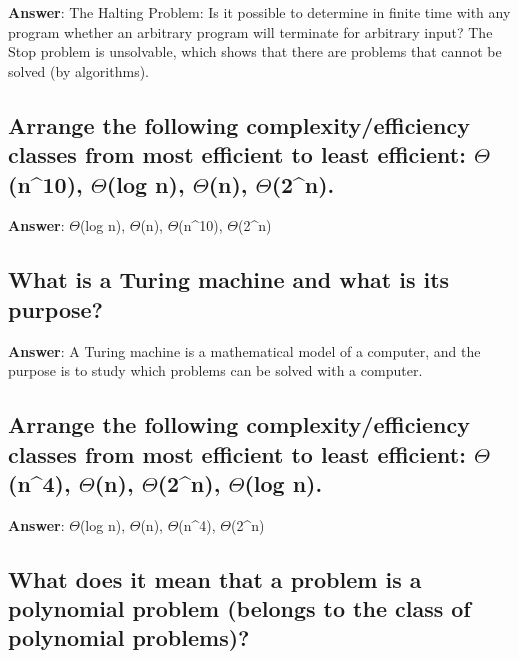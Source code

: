 \documentclass[a4paper,11pt,oneside]{article}
\begin{document}
\begin{sloppypar}
\label{q:331:sa:en:True}

\textbf{Answer}: The Halting Problem: Is it possible to determine in finite time with any program whether an arbitrary program will terminate for arbitrary input? The Stop problem is unsolvable, which shows that there are problems that cannot be solved (by algorithms).



\subsection{Arrange the following complexity/efficiency classes from most efficient to least efficient: \ensuremath{\Theta}(n^10), \ensuremath{\Theta}(log n), \ensuremath{\Theta}(n), \ensuremath{\Theta}(2^n).}

\label{q:332:sa:en:True}

\textbf{Answer}: \ensuremath{\Theta}(log n), \ensuremath{\Theta}(n), \ensuremath{\Theta}(n^10), \ensuremath{\Theta}(2^n)



\subsection{What is a Turing machine and what is its purpose?}

\label{q:333:sa:en:True}

\textbf{Answer}: A Turing machine is a mathematical model of a computer, and the purpose is to study which problems can be solved with a computer.



\subsection{Arrange the following complexity/efficiency classes from most efficient to least efficient: \ensuremath{\Theta}(n^4), \ensuremath{\Theta}(n), \ensuremath{\Theta}(2^n), \ensuremath{\Theta}(log n).}

\label{q:334:sa:en:True}

\textbf{Answer}: \ensuremath{\Theta}(log n), \ensuremath{\Theta}(n), \ensuremath{\Theta}(n^4), \ensuremath{\Theta}(2^n)



\subsection{What does it mean that a problem is a polynomial problem (belongs to the class of polynomial problems)?}


\end{sloppypar}
\end{document}
